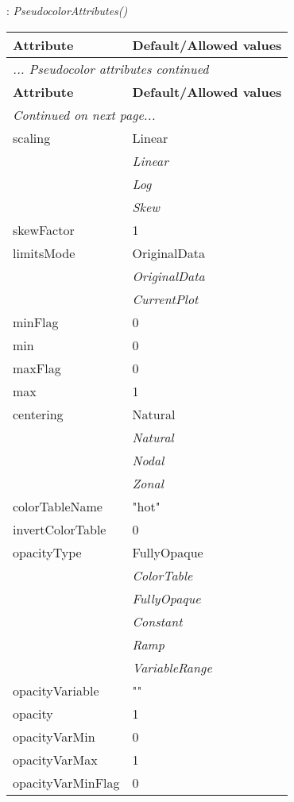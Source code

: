\documentclass[10pt,a4paper]{report}
\begin{document}
\newpage

{}
: {\it PseudocolorAttributes() }\\[-3mm]

\begin{longtable}{ll}
{\bf Attribute} & {\bf Default/Allowed values} \\
\hline \hline
\endfirsthead
\multicolumn{2}{l}{{\it ... Pseudocolor attributes continued}} \\
{\bf Attribute} & {\bf Default/Allowed values} \\
\hline \hline
\endhead
\hline
\multicolumn{2}{l}{{\it Continued on next page...}} \\
\endfoot
\hline
\endlastfoot

scaling  &  Linear   \\
 & {\it  Linear} \\
 & {\it  Log} \\
 & {\it  Skew} \\
skewFactor  &  1 \\
limitsMode  &  OriginalData   \\
 & {\it  OriginalData} \\
 & {\it  CurrentPlot} \\
minFlag  &  0 \\
min  &  0 \\
maxFlag  &  0 \\
max  &  1 \\
centering  &  Natural   \\
 & {\it  Natural} \\
 & {\it  Nodal} \\
 & {\it  Zonal} \\
colorTableName  &  "hot" \\
invertColorTable  &  0 \\
opacityType  &  FullyOpaque   \\
 & {\it  ColorTable} \\
 & {\it  FullyOpaque} \\
 & {\it  Constant} \\
 & {\it  Ramp} \\
 & {\it  VariableRange} \\
opacityVariable  &  "" \\
opacity  &  1 \\
opacityVarMin  &  0 \\
opacityVarMax  &  1 \\
opacityVarMinFlag  &  0 \\

\end{longtable}
\end{document}
